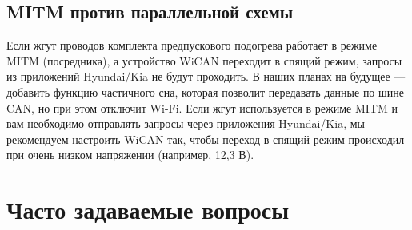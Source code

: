 \documentclass[superscriptaddress,onecolumn,floatfix]{revtex4-2}
\begin{document}
\subsection{MITM против параллельной схемы}
Если жгут проводов комплекта предпускового подогрева работает в режиме MITM (посредника), а устройство WiCAN переходит в спящий режим, запросы из приложений Hyundai/Kia не будут проходить. В наших планах на будущее — добавить функцию частичного сна, которая позволит передавать данные по шине CAN, но при этом отключит Wi-Fi. Если жгут используется в режиме MITM и вам необходимо отправлять запросы через приложения Hyundai/Kia, мы рекомендуем настроить WiCAN так, чтобы переход в спящий режим происходил при очень низком напряжении (например, 12,3 В). 

\section{Часто задаваемые вопросы}
\end{document}
